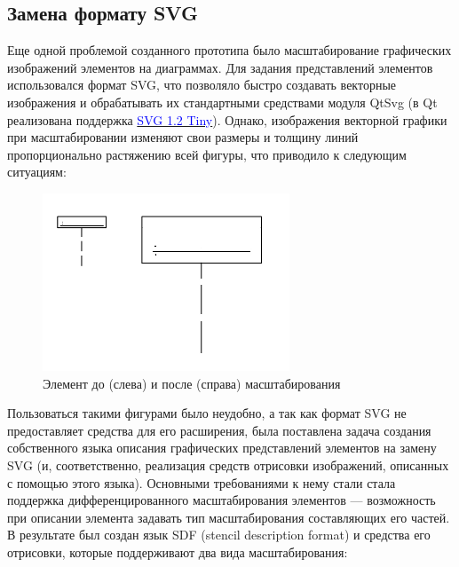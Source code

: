 \documentclass[a5paper]{article}
\newcommand\textstyleInternetlink[1]{\textcolor{blue}{#1}}
\begin{document}
\subsection{Замена формату SVG}

Еще одной проблемой созданного прототипа было масштабирование
графических изображений элементов на диаграммах. Для задания
представлений элементов использовался формат SVG, что позволяло быстро
создавать векторные изображения и обрабатывать их стандартными
средствами модуля QtSvg (в Qt реализована поддержка
\href{http://www.w3.org/TR/SVGMobile12/}{\textstyleInternetlink{SVG 1.2 Tiny}}). 
Однако, изображения векторной графики при масштабировании
изменяют свои размеры и толщину линий пропорционально растяжению всей
фигуры, что приводило к следующим ситуациям:


\begin{figure} [ht]
  \begin{center}
    \includegraphics[width=7.35cm,height=5.295cm]{draft04-img3.jpg}
    \caption{Элемент до (слева) и после (справа) масштабирования}
    \label{scaling}
  \end{center}
\end{figure}

%

Пользоваться такими фигурами было неудобно, а так как формат
SVG не предоставляет средства для его
расширения, была поставлена задача создания собственного языка описания
графических представлений элементов на замену SVG (и, соответственно,
реализация средств отрисовки изображений, описанных с помощью этого
языка). Основными требованиями к нему стали стала поддержка
дифференцированного масштабирования элементов --- возможность при
описании элемента задавать тип масштабирования составляющих его частей.
В результате был создан язык SDF (stencil description format) и
средства его отрисовки, которые поддерживают два вида масштабирования:
\end{document}
